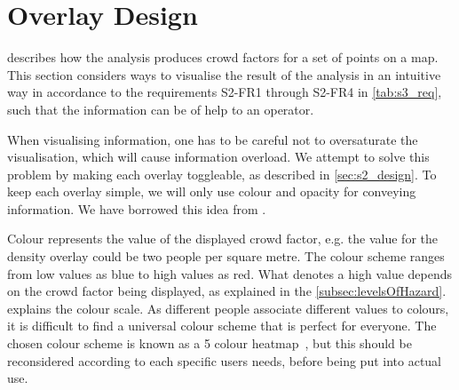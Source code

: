 \section{Overlay Design} \label{sec:s4_overlay}

 describes how the analysis produces crowd factors for a set of points on a map. This section considers ways to visualise the result of the analysis in an intuitive way in accordance to the requirements S2-FR1 through S2-FR4 in \cref{tab:s3_req}, such that the information can be of help to an operator.

When visualising information, one has to be careful not to oversaturate the visualisation, which will cause information overload. We attempt to solve this problem by making each overlay toggleable, as described in \cref{sec:s2_design}. To keep each overlay simple, we will only use colour and opacity for conveying information. We have borrowed this idea from \citet{wirz2012inferring}.

Colour represents the value of the displayed crowd factor, e.g. the value for the density overlay could be two people per square metre. The colour scheme ranges from low values as blue to high values as red. What denotes a high value depends on the crowd factor being displayed, as explained in the \cref{subsec:levelsOfHazard}.  explains the colour scale. As different people associate different values to colours, it is difficult to find a universal colour scheme that is perfect for everyone. The chosen colour scheme is known as a 5 colour heatmap~\cite{fiveheatmap}, but this should be reconsidered according to each specific users needs, before being put into actual use.

